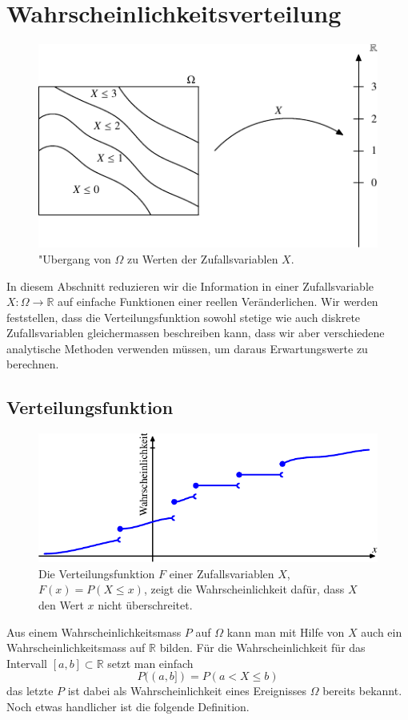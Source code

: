 \section{Wahrscheinlichkeitsverteilung}
\begin{figure}
\begin{center}
\includegraphics[width=0.7\hsize]{images/verteilungsfunktion-1}
\end{center}
\caption{"Ubergang von $\Omega$ zu Werten
der Zufallsvariablen $X$.
\label{bilduebergangzurverteilungsfunktion}}
\end{figure}
In diesem Abschnitt reduzieren wir die Information in einer Zufallsvariable
$X\colon\Omega\to\mathbb R$ auf einfache Funktionen einer reellen Veränderlichen.
Wir werden feststellen, dass die Verteilungsfunktion sowohl stetige wie auch
diskrete Zufallsvariablen gleichermassen beschreiben kann, dass wir
aber verschiedene analytische Methoden verwenden müssen, um daraus
Erwartungswerte zu berechnen.

\subsection{Verteilungsfunktion}
\begin{figure}
\begin{center}
\includegraphics{images/verteilungsfunktion-2}
\end{center}
\caption{Die Verteilungsfunktion $F$ einer Zufallsvariablen $X$,
$F(x)=P(X\le x)$, zeigt die Wahrscheinlichkeit dafür, dass $X$ den Wert $x$ nicht
überschreitet.
\label{bildverteilungsfunktion}}
\end{figure}
Aus einem Wahrscheinlichkeitsmass $P$ auf $\Omega$ kann man mit Hilfe
von $X$ auch ein Wahrscheinlichkeitsmass auf $\mathbb{R}$ bilden.
Für die
Wahrscheinlichkeit für das Intervall $[a,b]\subset\mathbb{R}$ setzt
man einfach
\[
P((a,b])=P(a< X\le b)
\]
das letzte $P$ ist dabei als Wahrscheinlichkeit eines Ereignisses $\Omega$
bereits bekannt.
Noch etwas handlicher ist die folgende Definition.

